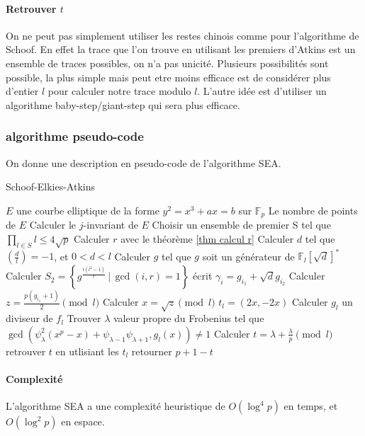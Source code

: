 \documentclass[12pt]{article}
\begin{document}
\paragraph*{Retrouver $t$}
On ne peut pas simplement utiliser les restes chinois comme pour l'algorithme de Schoof. En effet la trace que l'on trouve en utilisant les premiers d'Atkins est un ensemble de traces possibles, on n'a pas unicité. Plusieurs possibilités sont possible, la plus simple mais peut etre moins efficace est de considérer plus d'entier $l$ pour calculer notre trace modulo $l$. L'autre idée est d'utiliser un algorithme baby-step/giant-step qui sera plus efficace.

\newpage
\subsubsection{algorithme pseudo-code}
On donne une description en pseudo-code de l'algorithme SEA.
\begin{algorithm}
\caption{Schoof-Elkies-Atkins}
\begin{algorithmic}
\REQUIRE $E$ une courbe elliptique de la forme $y^2 = x^3 + ax = b$ sur $\mathbb{F}_p$
\ENSURE Le nombre de points de $E$
\STATE Calculer le $j$-invariant de $E$
\STATE Choisir un ensemble de premier S tel que $\prod_{l \in S}l \leq 4\sqrt{p}$
\STATE Calculer $r$ avec le théorème \ref{thm calcul r}
\STATE Calculer $d$ tel que $(\frac{d}{l}) = -1$, et $0<d<l$
\STATE Calculer $g$ tel que $g$ soit un générateur de $\mathbb{F}_l[\sqrt{d}]^*$
\STATE Calculer $S_2 = \left\{g^{\frac{i(l^2-1)}{r}} \, | \, \gcd(i,r) = 1 \right\}$
\STATE écrit $\gamma_i = g_{i_1} + \sqrt{d}g_{i_2}$
\STATE Calculer $z= \frac{p(g_{i_1} +1)}{2} \pmod l$
\STATE Calculer $x = \sqrt{z} \pmod l$
\STATE $t_l = (2x,-2x)$
\ENDIF
\ENDFOR
\ELSE
\STATE Calculer $g_l$ un diviseur de $f_l$
\STATE Trouver $\lambda$ valeur propre du Frobenius tel que $\gcd(\psi_{\lambda}^2(x^p-x) + \psi_{\lambda-1}\psi_{\lambda+1}, g_l(x)) \ne 1$
\STATE Calculer $t = \lambda + \frac{\lambda}{p} \pmod l$
\ENDIF
\ENDFOR
\STATE retrouver $t$ en utlisiant les $t_l$ 
\STATE retourner $p+1-t$
\end{algorithmic}
\end{algorithm}

\paragraph*{Complexité}
L'algorithme SEA a une complexité heuristique de $O(\log^4 p)$ en temps, et $O(\log^2 p)$ en espace.

\newpage


\end{document}
